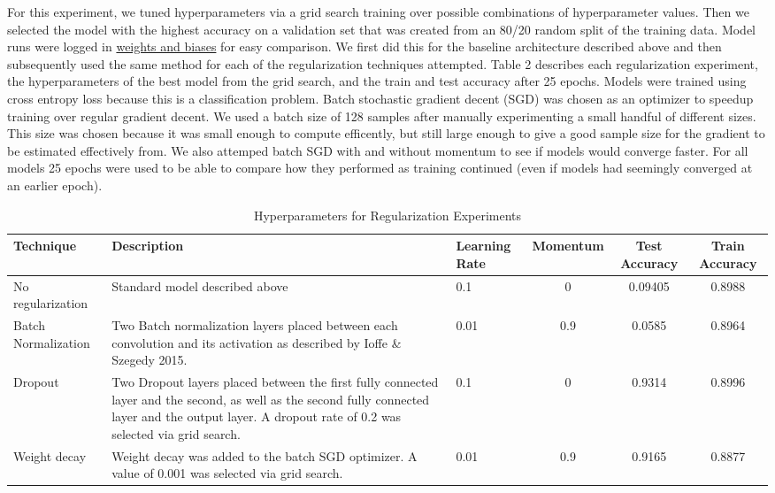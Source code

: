 \documentclass{article}
\begin{document}
For this experiment, we tuned hyperparameters via a grid search training over possible combinations of hyperparameter values. Then we selected the model with the highest accuracy on a validation set that was created from an 80/20 random split of the training data. Model runs were logged in \href{https://api.wandb.ai/links/mitkrieger-cornell-university/dcihajq4}{weights and biases} for easy comparison. We first did this for the baseline architecture described above and then subsequently used the same method for each of the regularization techniques attempted. Table 2 describes each regularization experiment, the hyperparameters of the best model from the grid search, and the train and test accuracy after 25 epochs. Models were trained using cross entropy loss because this is a classification problem. Batch stochastic gradient decent (SGD) was chosen as an optimizer to speedup training over regular gradient decent. We used a batch size of 128 samples after manually experimenting a small handful of different sizes. This size was chosen because it was small enough to compute efficently, but still large enough to give a good sample size for the gradient to be estimated effectively from. We also attemped batch SGD with and without momentum to see if models would converge faster. For all models 25 epochs were used to be able to compare how they performed as training continued (even if models had seemingly converged at an earlier epoch).

\begin{table}[ht]
    \centering
    \caption{Hyperparameters for Regularization Experiments}
    \label{tab:lenet5}
    \begin{tabular}{|p{1.5cm}|p{4cm}|p{1.5cm}|c|c|c|}
        \hline
        \textbf{Technique}      & \textbf{Description}  & \textbf{Learning Rate}    & \textbf{Momentum}  & \textbf{Test Accuracy} & \textbf{Train Accuracy}\\
        \hline
        \raggedright No regularization       & \raggedright Standard model described above                     & 0.1                       & 0  & 0.09405 & 0.8988\\
        \hline
        \raggedright Batch Normalization     & \raggedright Two Batch normalization layers placed between each convolution and its activation as described by Ioffe \& Szegedy 2015.                  & 0.01                      & 0.9  & 0.0585 & 0.8964 \\
        \hline
        \raggedright Dropout                 & \raggedright Two Dropout layers placed between the first fully connected layer and the second, as well as the second fully connected layer and the output layer. A dropout rate of 0.2 was selected via grid search.                 & 0.1                      & 0  &0.9314 & 0.8996\\
        \hline
        \raggedright Weight decay            & \raggedright Weight decay was added to the batch SGD optimizer. A value of 0.001 was selected via grid search.                  & 0.01                      & 0.9 & 0.9165 & 0.8877\\
        \hline
    \end{tabular}
\end{table}
\end{document}

